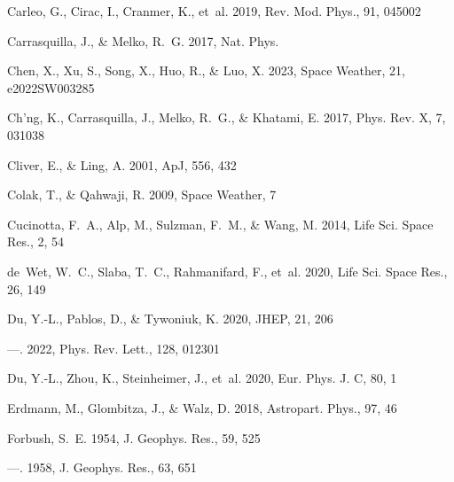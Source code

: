 \documentclass[twocolumn,,12pt]{aastex631}
\begin{document}
\begin{thebibliography}{99}
Carleo, G., Cirac, I., Cranmer, K., {et~al.} 2019, Rev. Mod. Phys., 91, 045002

Carrasquilla, J., \& Melko, R.~G. 2017, Nat. Phys.

Chen, X., Xu, S., Song, X., Huo, R., \& Luo, X. 2023, Space Weather, 21,
  e2022SW003285

Ch'ng, K., Carrasquilla, J., Melko, R.~G., \& Khatami, E. 2017, Phys. Rev. X,
  7, 031038

Cliver, E., \& Ling, A. 2001, ApJ, 556, 432

Colak, T., \& Qahwaji, R. 2009, Space Weather, 7

Cucinotta, F.~A., Alp, M., Sulzman, F.~M., \& Wang, M. 2014, Life Sci. Space
  Res., 2, 54

de~Wet, W.~C., Slaba, T.~C., Rahmanifard, F., {et~al.} 2020, Life Sci. Space
  Res., 26, 149

Du, Y.-L., Pablos, D., \& Tywoniuk, K. 2020{}, JHEP, 21, 206

---. 2022, Phys. Rev. Lett., 128, 012301

Du, Y.-L., Zhou, K., Steinheimer, J., {et~al.} 2020{}, Eur. Phys.
  J. C, 80, 1

Erdmann, M., Glombitza, J., \& Walz, D. 2018, Astropart. Phys., 97, 46

Forbush, S.~E. 1954, J. Geophys. Res., 59, 525

---. 1958, J. Geophys. Res., 63, 651


\end{thebibliography}
\end{document}
